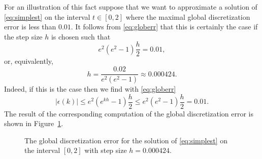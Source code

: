 \documentclass{ximera}
\begin{document}
For an illustration of this fact suppose that we want to approximate 
a solution of \eqref{eq:simplest} on the interval $t\in [0,2]$
where the maximal global discretization 
error is less than $0.01$.
It follows from \eqref{eq:globerr} that this is certainly the case if the
step size $h$ is chosen such that
\[
e^2(e^2-1)\frac{h}{2} = 0.01,
\]
or, equivalently,
\[
h = \frac{0.02}{e^2(e^2-1)} \approx 0.000424.
\]
Indeed, if this is the case then we find  with \eqref{eq:globerr}
\[
|\epsilon(k)| \le e^2(e^{kh}-1)\frac{h}{2} \le e^2(e^2-1)\frac{h}{2} = 0.01.
\]
The result of the corresponding \Matlab computation of the global
discretization error is shown in Figure~\ref{fig:globerr2}.
\begin{figure}[htb]
   \centerline{%
   }
   \caption{The global discretization error for the solution of
   \protect\eqref{eq:simplest} on the interval $[0,2]$ with
   step size $h=0.000424$.}
   \label{fig:globerr2}
\end{figure}



\EXER

\TEXER
\end{document}

